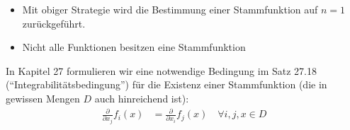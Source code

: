 \begin{remark}
	\vspace*{0pt}
	\begin{itemize}
		\item Mit obiger Strategie wird die Bestimmung einer Stammfunktion auf $n=1$ zurückgeführt.
		\item Nicht alle Funktionen besitzen eine Stammfunktion
	\end{itemize}
\end{remark}

\begin{underlinedenvironment}
	In Kapitel 27 formulieren wir eine notwendige Bedingung im Satz 27.18 ("`Integrabilitätsbedingung"') für die Existenz einer Stammfunktion (die in gewissen Mengen $D$ auch hinreichend ist): \begin{align*}
		\frac{\partial}{\partial x_j} f_i(x) &= \frac{\partial}{\partial x_i} f_j(x) \quad \forall i,j,x\in D
	\end{align*}
\end{underlinedenvironment}